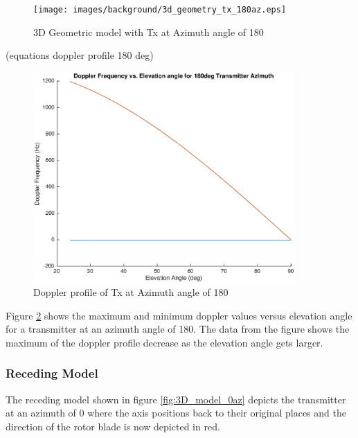 \begin{figure}
	\begin{center}
		\texttt{[image: images/background/3d\_geometry\_tx\_180az.eps]}
		\caption{3D Geometric model with Tx at Azimuth angle of 180\textdegree}
		\label{fig:3D_model_180az}
	\end{center}
\end{figure}

(equations doppler profile 180 deg)

\begin{figure}
	\begin{center}
		\includegraphics[width=10cm]{images/background/3d_geometry_tx_180az_doppler_profile.eps}
		\caption{Doppler profile of Tx at Azimuth angle of 180\textdegree}
		\label{fig:3D_model_180az_doppler}
	\end{center}
\end{figure}

Figure \ref{fig:3D_model_180az_doppler} shows the maximum and minimum doppler values versus elevation angle for a transmitter at an azimuth angle of 180\textdegree. The data from the figure shows the maximum of the doppler profile decrease as the elevation angle gets larger.

\subsubsection{Receding Model}
The receding model shown in figure \ref{fig:3D_model_0az} depicts the transmitter at an azimuth of 0 \textdegree \space where the axis positions back to their original places and the direction of the rotor blade is now depicted in red.

